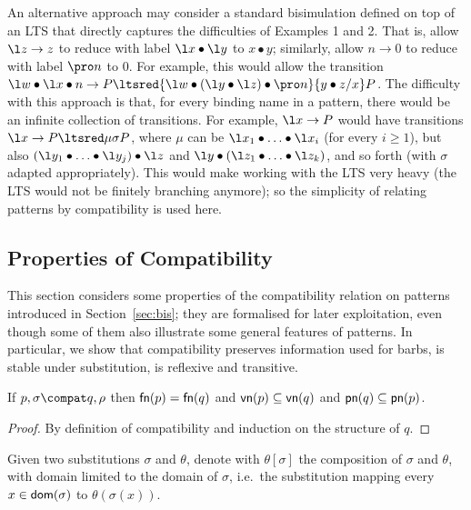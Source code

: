 \documentclass{LMCS}
\begin{document}
An alternative approach may consider a standard bisimulation defined on top of an LTS that directly captures
the difficulties of Examples 1 and 2.
That is, allow $\l z\to z$ to reduce with label $\l x\bullet \l y$ to $x\bullet y$; similarly, allow
$n\to 0$ to reduce with label $\pro n$ to $0$. For example, this would allow the transition 
$\l w\bullet \l x\bullet n \to P \ltsred{\l w\bullet (\l y\bullet \l z)\bullet \pro n} \{y\bullet z/x\}P$.
The difficulty with this approach is that, for every binding name in a pattern, there would be an
infinite collection of transitions. For example, $\l x \to P$ would have transitions $\l x\to P\ltsred\mu \sigma P$, 
where $\mu$ can be $\l x_1\bullet \ldots\bullet \l x_i$ (for every $i \geq 1$), but also
$(\l y_1\bullet \ldots\bullet \l y_j)\bullet \l z$ and $\l y\bullet(\l z_1\bullet\ldots\bullet \l z_k)$,
and so forth (with $\sigma$ adapted appropriately).
This would make working with the LTS very heavy (the LTS would not be finitely branching anymore);
so the simplicity of relating patterns by compatibility is used here.


\subsection{Properties of Compatibility}

This section considers some properties of the compatibility relation on patterns introduced in Section~\ref{sec:bis}; 
they are formalised for later exploitation, even though some of them also illustrate some general features of patterns.
In particular, we show that compatibility preserves information used for barbs, is stable under substitution, is reflexive and transitive.

\begin{lem}
\label{prop:compat-fn}
If $p,\sigma\compat q,\rho$ then ${\sf fn}(p)={\sf fn}(q)$ and ${\sf vn}(p) \subseteq {\sf vn}(q)$ 
and ${\sf pn}(q) \subseteq {\sf pn}(p)$.
\end{lem}
\begin{proof}
By definition of compatibility and induction on the structure of $q$.
\end{proof}


Given two substitutions $\sigma$ and $\theta$, denote with $\theta[\sigma]$ 
the composition of $\sigma$ and $\theta$,
with domain limited to the domain of $\sigma$, 
i.e.\ the substitution mapping every $x\in{\sf dom}(\sigma)$ to $\theta(\sigma(x))$.
\end{document}
